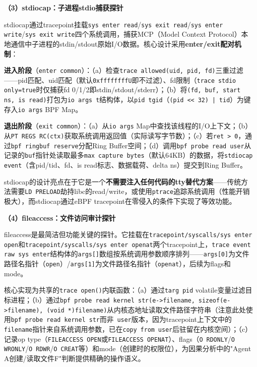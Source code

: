 \documentclass[a4paper]{ctexart}
\makeatletter
\renewcommand{\_}{%
  \ifmmode
    \nfss@text{\textunderscore}%
  \else
    \textunderscore\discretionary{}{}{}%
  \fi}
\makeatother
\begin{document}
\textbf{（3）stdiocap：子进程stdio捕获探针}


stdiocap通过tracepoint挂载\texttt{sys\_enter\_read}/\texttt{sys\_exit\_read}/\texttt{sys\_enter\_write}/\texttt{sys\_exit\_write}四个系统调用，捕获MCP（Model Context Protocol）本地通信中子进程的stdin/stdout原始I/O数据。核心设计采用\textbf{enter/exit配对机制}：


\textbf{进入阶段}（\texttt{enter\_common}）：（a）检查\texttt{trace\_allowed(uid, pid, fd)}三重过滤——pid匹配、uid匹配（默认\texttt{0xffffffffU}即不过滤）、fd限制（\texttt{trace\_stdio\_only=true}时仅捕获fd 0/1/2即stdin/stdout/stderr）；（b）将\texttt{(fd, buf, start\_ns, is\_read)}打包为\texttt{io\_args\_t}结构体，以\texttt{pid\_tgid}（\texttt{(pid << 32) | tid}）为键存入\texttt{io\_args} BPF Map。


\textbf{退出阶段}（\texttt{exit\_common}）：（a）从\texttt{io\_args} Map中查找该线程的I/O上下文；（b）从\texttt{PT\_REGS\_RC(ctx)}获取系统调用返回值（实际读写字节数）；（c）若\texttt{ret > 0}，通过\texttt{bpf\_ringbuf\_reserve}分配Ring Buffer空间；（d）调用\texttt{bpf\_probe\_read\_user}从记录的\texttt{buf}指针处读取最多\texttt{max\_capture\_bytes}（默认64KB）的数据，将\texttt{stdiocap\_event}（含pid/tid、fd、is\_read标志、数据载荷、delta\_ns）提交到Ring Buffer。


stdiocap的设计亮点在于它是一个\textbf{不需要注入任何代码的tty替代方案}——传统方法需要\texttt{LD\_PRELOAD}劫持libc的read/write，或使用\texttt{ptrace}追踪系统调用（性能开销极大），而stdiocap通过eBPF tracepoint在零侵入的条件下实现了等效功能。


\textbf{（4）fileaccess：文件访问审计探针}


fileaccess是最简洁但功能关键的探针。它挂载在\texttt{tracepoint/syscalls/sys\_enter\_open}和\texttt{tracepoint/syscalls/sys\_enter\_openat}两个tracepoint上，\texttt{trace\_event\_raw\_sys\_enter}结构体的\texttt{args[]}数组按系统调用参数顺序排列——\texttt{args[0]}为文件路径名指针（\texttt{open}）/\texttt{args[1]}为文件路径名指针（\texttt{openat}），后续为flags和mode。


核心实现为共享的\texttt{trace\_open()}内联函数：（a）通过\texttt{targ\_pid} volatile变量过滤目标进程；（b）通过\texttt{bpf\_probe\_read\_kernel\_str(e->filename, sizeof(e->filename), (void *)filename)}从内核态地址读取文件路径字符串（注意此处使用\texttt{bpf\_probe\_read\_kernel\_str}而非\texttt{\_user}版本，因为tracepoint上下文中的\texttt{filename}指针来自系统调用参数，已在\texttt{copy\_from\_user}后驻留在内核空间）；（c）记录op\_type（\texttt{FILEACCESS\_OPEN}或\texttt{FILEACCESS\_OPENAT}）、flags（\texttt{O\_RDONLY}/\texttt{O\_WRONLY}/\texttt{O\_RDWR}/\texttt{O\_CREAT}等）和mode（创建时的权限位），为因果分析中的"Agent A创建/读取文件F"判断提供精确的操作语义。
\end{document}
